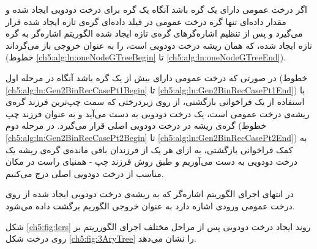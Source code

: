 اگر درخت عمومی دارای یک گره باشد آنگاه یک گره برای درخت دودویی ایجاد شده و مقدار داده‌ای تنها گره درخت عمومی در فیلد داده‌ای گره‌ی تازه ایجاد شده قرار می‌گیرد و پس از تنظیم اشاره‌گرهای گره‌ی تازه ایجاد شده الگوریتم {} اشاره‌گر به گره تازه ایجاد شده، که همان ریشه درخت دودویی است، را به عنوان خروجی باز می‌گرداند (خطوط {\ref{ch5:alg:ln:oneNodeGTreeBegin}} تا {\ref{ch5:alg:ln:oneNodeGTreeEnd}}).

در صورتی که درخت عمومی دارای بیش از یک گره باشد آنگاه در مرحله اول (خطوط {\ref{ch5:alg:ln:Gen2BinRecCasePt1Begin}} تا {\ref{ch5:alg:ln:Gen2BinRecCasePt1End}}) با استفاده از یک فراخوانی بازگشتی، از روی زیردرختی که سمت چپ‌ترین فرزند گره‌ی ریشه‌ی درخت عمومی است، یک درخت دودویی به دست می‌آید و به عنوان فرزند چپ گره‌ی ریشه در درخت دودویی اصلی قرار می‌گیرد. در مرحله دوم (خطوط {\ref{ch5:alg:ln:Gen2BinRecCasePt2Begin}} تا {\ref{ch5:alg:ln:Gen2BinRecCasePt2End}}) به کمک فراخوانی بازگشتی، به ازای هر یک از فرزندان باقی مانده‌ی گره‌ی ریشه یک درخت دودویی به دست می‌آوریم و طبق روش فرزند چپ - همنیای راست در مکان مناسب از درخت دودویی اصلی درج می‌کنیم.

در انتهای اجرای الگوریتم اشاره‌گر {} که به ریشه‌ی درخت دودویی ایجاد شده از روی درخت عمومی ورودی اشاره دارد به عنوان خروجی الگوریم برگشت داده می‌شود.

شکل‌ {\eqref{ch5:fig:lcrs}} روند ایجاد درخت دودویی پس از مراحل مختلف اجرای الگورریتم {} بر روی درخت شکل  {\eqref{ch5:fig:3AryTree}} را نشان می‌دهد.

